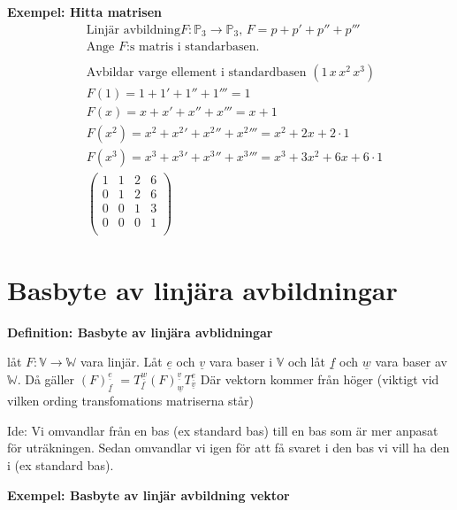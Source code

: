 \begin{multicols}{2}
\textbf{Exempel: Hitta matrisen}
\begin{align*}
  &\text{Linjär avbildning} F:\mathbb{P}_3\to\mathbb{P}_3, \, F= p+ p'+ p''+ p''' \\
  &\text{Ange $F$:s matris i standarbasen.} \\
  &\\
  &\text{Avbildar varge ellement i standardbasen } (1 \, x \, x^2 \, x^3) \\
  &F(1) = 1 + 1' + 1'' + 1''' = 1 \\
  &F(x) = x + x' + x'' + x''' = x+1 \\
  &F(x^2) = {x^2} + {x^2}' + {x^2}'' + {x^2}''' = x^2 + 2x + 2\cdot1 \\
  &F(x^3) = {x^3} + {x^3}' + {x^3}'' + {x^3}''' = x^3 + 3x^2 + 6x + 6\cdot1 \\
  &\left(\begin{array}{cccc}
    1 & 1 & 2 & 6 \\
    0 & 1 & 2 & 6 \\
    0 & 0 & 1 & 3 \\
    0 & 0 & 0 & 1 \\
  \end{array}\right)   
\end{align*}


\section{Basbyte av linjära avbildningar}
\textbf{Definition: Basbyte av linjära avblidningar}\par
låt $F: \mathbb{V}\to\mathbb{W}$ vara linjär. Låt $\underline{e}$ och
$\underline{v}$ vara baser i $\mathbb{V}$ och låt $\underline{f}$
och $\underline{w}$ vara baser av $\mathbb{W}$. Då gäller
${(F)}^{\underline{e}}_{\underline{f}}$ 
$=T^{\underline{w}}_{\underline{f}}{(F)}^{\underline{v}}_{\underline{w}}T^{\underline{e}}_{\underline{v}}$
Där vektorn kommer från höger (viktigt vid vilken ording transfomations matriserna står)

Ide: Vi omvandlar från en bas (ex standard bas) till en bas som
är mer anpasat för uträkningen.
Sedan omvandlar vi igen för att få svaret i den bas vi vill ha
den i (ex standard bas).

\textbf{Exempel: Basbyte av linjär avbildning vektor}


\end{multicols}
